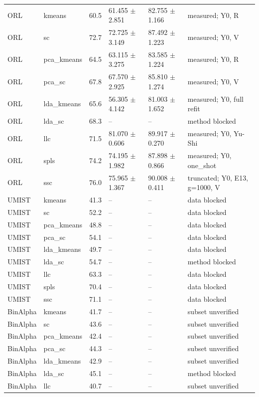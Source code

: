 \begin{longtable}{llrllp{2.9cm}}
ORL & kmeans & 60.5 & 61.455 $\pm$ 2.851 & 82.755 $\pm$ 1.166 & measured; Y0, R \\
ORL & sc & 72.7 & 72.725 $\pm$ 3.149 & 87.492 $\pm$ 1.223 & measured; Y0, V \\
ORL & pca\_kmeans & 64.5 & 63.115 $\pm$ 3.275 & 83.585 $\pm$ 1.224 & measured; Y0, R \\
ORL & pca\_sc & 67.8 & 67.570 $\pm$ 2.925 & 85.810 $\pm$ 1.274 & measured; Y0, V \\
ORL & lda\_kmeans & 65.6 & 56.305 $\pm$ 4.142 & 81.003 $\pm$ 1.652 & measured; Y0, full refit \\
ORL & lda\_sc & 68.3 & -- & -- & method blocked \\
ORL & llc & 71.5 & 81.070 $\pm$ 0.606 & 89.917 $\pm$ 0.270 & measured; Y0, Yu-Shi \\
ORL & spls & 74.2 & 74.195 $\pm$ 1.982 & 87.898 $\pm$ 0.866 & measured; Y0, one\_shot \\
ORL & ssc & 76.0 & 75.965 $\pm$ 1.367 & 90.008 $\pm$ 0.411 & truncated; Y0, E13, g=1000, V \\
UMIST & kmeans & 41.3 & -- & -- & data blocked \\
UMIST & sc & 52.2 & -- & -- & data blocked \\
UMIST & pca\_kmeans & 48.8 & -- & -- & data blocked \\
UMIST & pca\_sc & 54.1 & -- & -- & data blocked \\
UMIST & lda\_kmeans & 49.7 & -- & -- & data blocked \\
UMIST & lda\_sc & 54.7 & -- & -- & method blocked \\
UMIST & llc & 63.3 & -- & -- & data blocked \\
UMIST & spls & 70.4 & -- & -- & data blocked \\
UMIST & ssc & 71.1 & -- & -- & data blocked \\
BinAlpha & kmeans & 41.7 & -- & -- & subset unverified \\
BinAlpha & sc & 43.6 & -- & -- & subset unverified \\
BinAlpha & pca\_kmeans & 42.4 & -- & -- & subset unverified \\
BinAlpha & pca\_sc & 44.3 & -- & -- & subset unverified \\
BinAlpha & lda\_kmeans & 42.9 & -- & -- & subset unverified \\
BinAlpha & lda\_sc & 45.1 & -- & -- & method blocked \\
BinAlpha & llc & 40.7 & -- & -- & subset unverified \\

\end{longtable}
